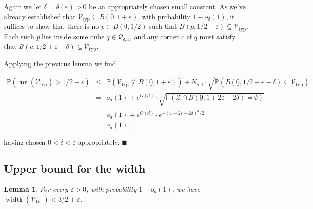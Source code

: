 \documentclass[11pt]{article}%
\newenvironment{proof}{\vspace{1ex}\noindent{\bf Proof.}}{\hspace*{\fill}$\blacksquare$\vspace{1ex}}
\newtheorem{lemma} [theorem] {Lemma}%
\newcommand{\Qcal}[0]{\ensuremath{{\mathcal Q}}}
\newcommand{\Vcal}[0]{\ensuremath{{\mathcal V}}}
\newcommand{\Zcal}[0]{\ensuremath{{\mathcal Z}}}
\newcommand{\Pee}[0]{\ensuremath{{\mathbb P}}}
\newcommand{\eps}{\varepsilon}
\newcommand{\orig}{\underline{0}}
\DeclareMathOperator{\inr}{inr}
\DeclareMathOperator{\width}{width}
\newcommand{\Vtyp}[0]{\Vcal_{\text{typ}}}
\begin{document}
\begin{proof}
Again we let $\delta=\delta(\eps)>0$ be an appropriately chosen small constant.
As we've already established that $\Vtyp \subseteq B(\orig,1+\eps)$, with probability $1-o_d(1)$,
it suffices to show that there is no $p \in B(\orig,1/2)$ such that $B(p,1/2+\eps) \subseteq \Vtyp$.
Each such $p$ lies inside some cube $q \in \Qcal_{\delta,1}$, and any corner $c$ of $q$ 
must satisfy that $B(c,1/2+\eps-\delta) \subseteq \Vtyp$.

Applying the previous lemma we find

$$ \begin{array}{rcl} 
\Pee( \inr(\Vtyp) > 1/2+\eps ) 
& \leq &  
\Pee\left( \Vtyp \not\subseteq  B(\orig,1+\eps) \right) 
+ N_{\delta,1} \cdot \sqrt{\Pee( B(\orig,1/2+\eps-\delta) \subseteq \Vtyp )} \\
& = & o_d(1) + e^{O(d)} \cdot \sqrt{\Pee( \Zcal \cap B(\orig,1+2\eps-2\delta) = \emptyset )} \\
& = & o_d(1) + e^{O(d)} \cdot e^{-(1+2\eps-2\delta)^d/2 } \\
& = & o_d(1), \end{array} $$

\noindent
having chosen $0<\delta<\eps$ appropriately.
\end{proof}


\subsection{Upper bound for the width}


\begin{lemma}
 For every $\eps>0$, with probability $1-o_d(1)$, we have
 $\width(\Vtyp) < 3/2 + \eps$.
\end{lemma}
\end{document}

